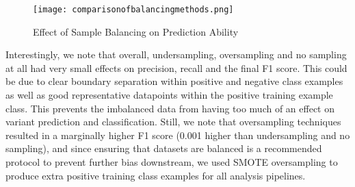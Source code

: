 \documentclass{article}
\begin{document}
\begin{figure}[H]
\centering
\texttt{[image: comparisonofbalancingmethods.png]}
\caption{Effect of Sample Balancing on Prediction Ability                 }
\end{figure}
Interestingly, we note that overall, undersampling, oversampling and no sampling at all had very small effects on precision, recall and the final F1 score. This could be due to clear boundary separation within positive and negative class examples as well as good representative datapoints within the positive training example class. This prevents the imbalanced data from having too much of an effect on variant prediction and classification. Still, we note that oversampling techniques resulted in a marginally higher F1 score (0.001 higher than undersampling and no sampling), and since ensuring that datasets are balanced is a recommended protocol to prevent further bias downstream, we used SMOTE oversampling to produce extra positive training class examples for all analysis pipelines.
\end{document}
